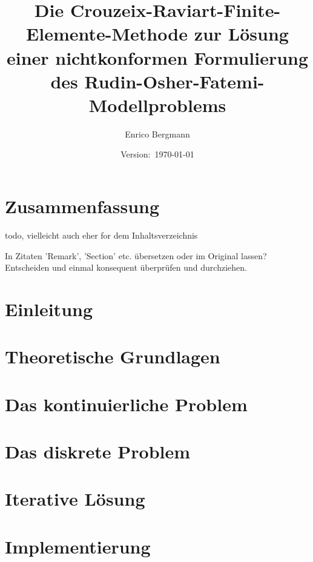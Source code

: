 \documentclass[draft=false,twoside,11pt]{scrreprt}
\title{Die Crouzeix\--Raviart\--Finite\--Elemente\--Methode zur Lösung einer
nichtkonformen Formulierung des Rudin\--Osher\--Fatemi\--Modellproblems}
\author{Enrico Bergmann}
\date{Version:~\today}
\begin{document}
\maketitle
\tableofcontents

\chapter*{Zusammenfassung}
todo, vielleicht auch eher for dem Inhaltsverzeichnis



\bigskip
In Zitaten 'Remark', 'Section' etc. übersetzen oder  im Original lassen? 
Entscheiden und einmal konsequent überprüfen und durchziehen.

\chapter{Einleitung}
\label{chap:introduction}


\chapter{Theoretische Grundlagen}
\label{chap:theoreticalBasics}


\chapter{Das kontinuierliche Problem}
\label{chap:continuousProblem}


\chapter{Das diskrete Problem}
\label{chap:discreteProblem}


\chapter{Iterative Lösung}
\label{chap:algorithm}


\chapter{Implementierung}
\label{chap:implementation}

\end{document}
